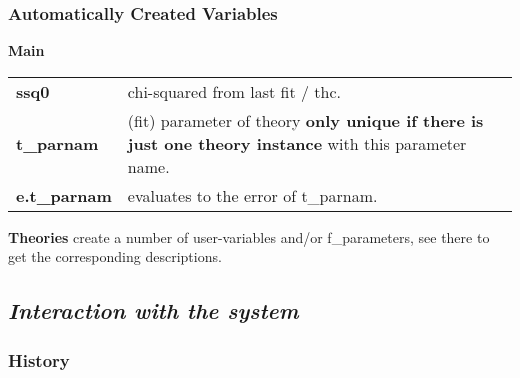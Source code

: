\documentclass[]{article}
\begin{document}
\hypertarget{automatically-created-variables}{%
\subsubsection{Automatically Created
Variables}\label{automatically-created-variables}}

\textbf{Main}

\begin{longtable}[]{@{}ll@{}}
\toprule
\endhead
\textbf{ssq0} & chi-squared from last fit / thc.\tabularnewline
\textbf{t\_parnam} & (fit) parameter of theory \textbf{only unique if
there is just one theory instance} with this parameter
name.\tabularnewline
\textbf{e.t\_parnam} & evaluates to the error of
t\_parnam.\tabularnewline
\bottomrule
\end{longtable}

\textbf{Theories} create a number of user-variables and/or
f\_parameters, see there to get the corresponding descriptions.

\hypertarget{interaction-with-the-system}{%
\subsection{\texorpdfstring{\emph{Interaction with the system
}}{Interaction with the system }}\label{interaction-with-the-system}}

\hypertarget{history}{%
\subsubsection{History}\label{history}}
\end{document}
